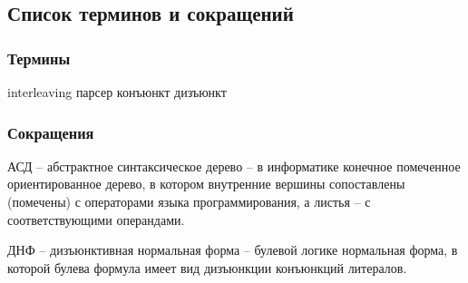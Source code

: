 \subsection*{Список терминов и сокращений}

\subsubsection*{Термины}

interleaving
парсер
конъюнкт
дизъюнкт


\subsubsection*{Сокращения}

АСД -- абстрактное синтаксическое дерево -- в информатике конечное помеченное ориентированное дерево, в котором внутренние вершины сопоставлены (помечены) с операторами языка программирования, а листья -- с соответствующими операндами.

ДНФ -- дизъюнктивная нормальная форма -- булевой логике нормальная форма, в которой булева формула имеет вид дизъюнкции конъюнкций литералов.
